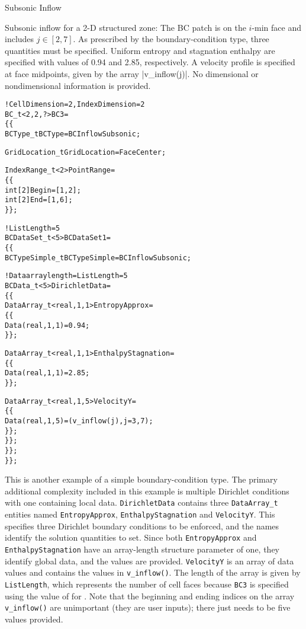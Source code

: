 \begin{example}{Subsonic Inflow}
\label{ex:bc3}

Subsonic inflow for a 2-D structured zone: The BC patch is on the
$i$-min face and  includes $j \in [2, 7]$.
As prescribed by the boundary-condition type, three quantities must be
specified.  Uniform entropy and stagnation enthalpy are specified with
values of 0.94 and 2.85, respectively.  A velocity profile is specified
at face midpoints, given by the array |v_inflow(j)|.  No dimensional or
nondimensional information is provided.
\begin{alltt}
  !  CellDimension = 2, IndexDimension = 2
  BC\_t<2,2,?> BC3 =
    \{\{
    BCType\_t BCType = BCInflowSubsonic ;

    GridLocation\_t GridLocation = FaceCenter ;

    IndexRange\_t<2> PointRange = 
      \{\{ 
      int[2] Begin = [1,2] ;
      int[2] End   = [1,6] ;
      \}\} ;

    !  ListLength = 5
    BCDataSet\_t<5> BCDataSet1 =
      \{\{
      BCTypeSimple\_t BCTypeSimple = BCInflowSubsonic ;

      !  Data array length = ListLength = 5
      BCData\_t<5> DirichletData =
        \{\{
        DataArray\_t<real, 1, 1> EntropyApprox = 
          \{\{ 
          Data(real, 1, 1) = 0.94 ;
          \}\} ;

        DataArray\_t<real, 1, 1> EnthalpyStagnation = 
          \{\{ 
          Data(real, 1, 1) = 2.85 ;
          \}\} ;

        DataArray\_t<real, 1, 5> VelocityY =
          \{\{
          Data(real, 1, 5) = (v\_inflow(j), j=3,7) ;
          \}\} ;
        \}\} ;
      \}\} ;
    \}\} ;
\end{alltt}
This is another example of a simple boundary-condition type.
The primary additional complexity included in this example is multiple
Dirichlet conditions with one containing local data.
\texttt{DirichletData} contains three \texttt{DataArray\_t} entities named
\texttt{EntropyApprox}, \texttt{EnthalpyStagnation} and \texttt{VelocityY}.
This specifies three Dirichlet boundary conditions to be enforced, and
the names identify the solution quantities to set.
Since both \texttt{EntropyApprox} and \texttt{EnthalpyStagnation} have an
array-length structure parameter of one, they identify global data, and
the values are provided.
\texttt{VelocityY} is an array of data values and contains the values in
\texttt{v\_inflow()}.
The length of the array is given by \texttt{ListLength}, which represents
the number of cell faces because \texttt{BC3} is specified using
the value of  for .
Note that the beginning and ending indices on the array
\texttt{v\_inflow()} are unimportant (they are user inputs); there just
needs to be five values provided.
\end{example}

